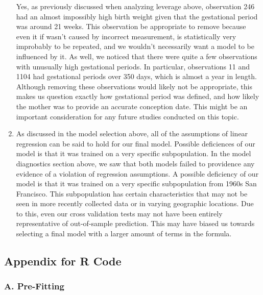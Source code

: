 \documentclass[]{article}
\begin{document}
\begin{enumerate}
  Yes, as previously discussed when analyzing leverage above,
  observation 246 had an almost impossibly high birth weight given that
  the gestational period was around 21 weeks. This observation be
  appropriate to remove because even it if wasn't caused by incorrect
  measurement, is statistically very improbably to be repeated, and we
  wouldn't necessarily want a model to be influenced by it. As well, we
  noticed that there were quite a few observations with unusually high
  gestational periods. In particular, observations 11 and 1104 had
  gestational periods over 350 days, which is almost a year in length.
  Although removing these observations would likely not be appropriate,
  this makes us question exactly how gestational period was defined, and
  how likely the mother was to provide an accurate conception date. This
  might be an important consideration for any future studies conducted
  on this topic.
\item
  As discussed in the model selection above, all of the assumptions of
  linear regression can be said to hold for our final model. Possible
  deficiences of our model is that it was trained on a very specific
  subpopulation. In the model diagnostics section above, we saw that
  both models failed to providence any evidence of a violation of
  regression assumptions. A possible deficiency of our model is that it
  was trained on a very specific subpopulation from 1960s San Francisco.
  This subpopulation has certain characteristics that may not be seen in
  more recently collected data or in varying geographic locations. Due
  to this, even our cross validation tests may not have been entirely
  representative of out-of-sample prediction. This may have biased us
  towards selecting a final model with a larger amount of terms in the
  formula.
\end{enumerate}

\subsection{Appendix for R Code}\label{appendix-for-r-code}

\subsubsection{A. Pre-Fitting}\label{a.-pre-fitting}
\end{document}
